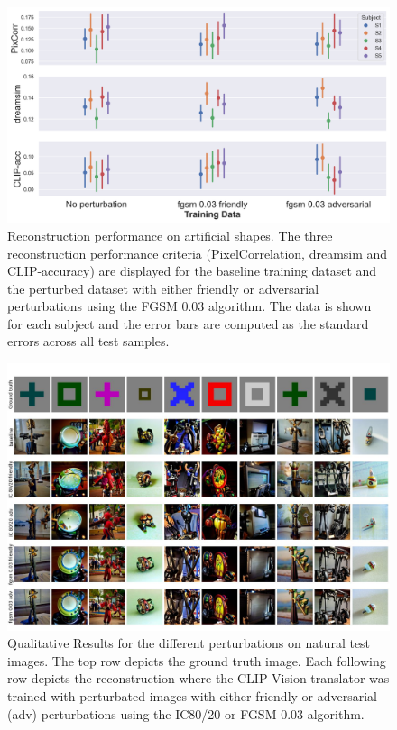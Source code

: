 \begin{figure}[H]
    \centering
    \includegraphics[width=1\textwidth]{plots/advpert_reconstruction_art_fgsm_0.03.png}
    \caption[Experiment 3: Reconstruction performance on artificial shapes with FGSM]{Reconstruction performance on artificial shapes. The three reconstruction performance criteria (PixelCorrelation, dreamsim and CLIP-accuracy) are displayed for the baseline training dataset and the perturbed dataset with either friendly or adversarial perturbations using the FGSM 0.03 algorithm. The data is shown for each subject and the error bars are computed as the standard errors across all test samples.}\label{fig:advpert_reconstruction_art_fgsm_0.03}
\end{figure}

\begin{figure}[H]
   \centering
   \includegraphics[width=1\textwidth]{plots/advpert_qual_test.JPEG}
   \caption[Experiment 3: Reconstructed images on natural test images for different perturbations]{Qualitative Results for the different perturbations on natural test images. The top row depicts the ground truth image. Each following row depicts the reconstruction where the CLIP Vision translator was trained with perturbated images with either friendly or adversarial (adv) perturbations using the IC80/20 or FGSM 0.03 algorithm.}\label{fig:advpert_qual_test}
\end{figure}


